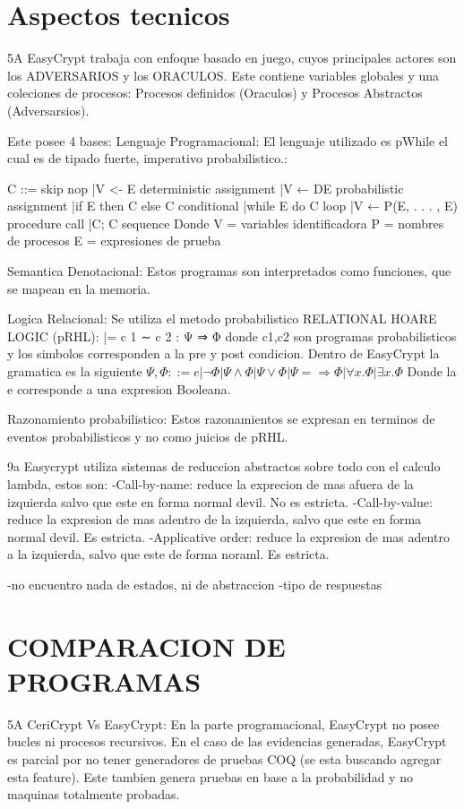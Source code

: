 \documentclass[runningheads,a4paper]{llncs}
\begin{document}
\section{Aspectos tecnicos}
5A
\cite{article5}
EasyCrypt trabaja con enfoque basado en juego, cuyos principales actores son los ADVERSARIOS y los ORACULOS. Este contiene variables globales y una coleciones de procesos: Procesos definidos (Oraculos) y Procesos Abstractos (Adversarsios).

Este posee 4 bases:
Lenguaje Programacional:
El lenguaje utilizado es pWhile el cual es de tipado fuerte, imperativo probabilistico.:

C ::= skip					nop
	|V <- E					deterministic assignment
	|V ← DE					probabilistic assignment
	|if E then C else C		conditional
	|while E do C			loop
	|V ← P(E, . . . , E)	procedure call
	|C; C					sequence
Donde V = {variables identificadora}
	P = {nombres de procesos}
	E = {expresiones de prueba}


Semantica Denotacional:
Estos programas son interpretados como funciones, que se mapean en la memoria.

Logica Relacional:
Se utiliza el metodo probabilistico RELATIONAL HOARE LOGIC (pRHL):
|= c 1 ∼ c 2 : Ψ ⇒ Φ	donde c1,c2 son programas probabilisticos y los simbolos corresponden a la pre y post condicion.
Dentro de EasyCrypt la gramatica es la siguiente
$Ψ, Φ ::= e | ¬Φ | Ψ ∧ Φ | Ψ ∨ Φ | Ψ =⇒ Φ | ∀x. Φ | ∃x. Φ$
Donde la e corresponde a una expresion Booleana.

Razonamiento probabilistico:
Estos razonamientos se expresan en terminos de eventos probabilisticos y no como juicios de pRHL.

9a
\cite{article6}
Easycrypt utiliza sistemas de reduccion abstractos sobre todo con el calculo lambda, estos son:
	-Call-by-name: reduce la exprecion de mas afuera de la izquierda salvo que este en forma normal devil. No es estricta.
	-Call-by-value: reduce la expresion de mas adentro de la izquierda, salvo que este en forma normal devil. Es estricta.
	-Applicative order: reduce la expresion de mas adentro a la izquierda, salvo que este de forma noraml. Es estricta.



-no encuentro nada de estados, ni de abstraccion
-tipo de respuestas


\section{COMPARACION DE PROGRAMAS}
5A
\cite{article5}
CeriCrypt Vs EasyCrypt:
En la parte programacional, EasyCrypt no posee bucles ni procesos recursivos. En el caso de las evidencias generadas, EasyCrypt es parcial por no tener generadores de pruebas COQ (se esta buscando agregar esta feature). Este tambien genera pruebas en base a la probabilidad y no maquinas totalmente probadas.
\end{document}
